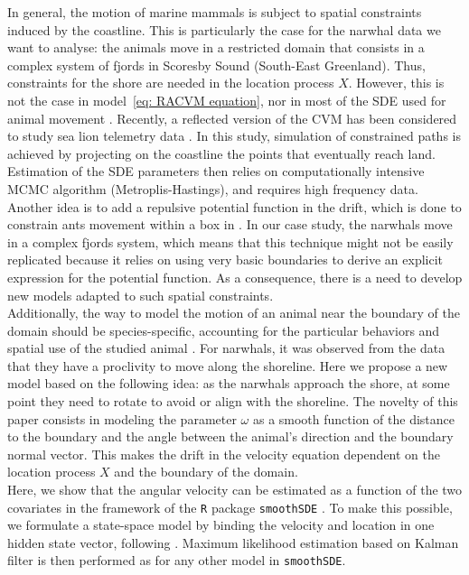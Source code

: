 \documentclass[11pt]{article}
\newcommand {\1}{\mathbb{1}}
\begin{document}
In general, the motion of marine mammals is subject to spatial constraints induced by the coastline. This is particularly the case for the narwhal data we want to analyse: the animals move in a restricted domain that consists in a complex system of fjords in Scoresby Sound (South-East Greenland). Thus, constraints for the shore are needed in the location process $X$. However, this is not the case in model~\ref{eq: RACVM equation}, nor in most of the SDE used for animal movement \cite{johnson_continuoustime_2008,michelot_varying-coefficient_2021,gurarie_correlated_2017}. 
Recently, a reflected version of the CVM has been considered to study sea lion telemetry data \cite{hanks_reflected_2017}.
In this study, simulation of constrained paths is achieved by projecting on the coastline the  points that eventually reach land. Estimation of the SDE parameters then relies on computationally intensive MCMC algorithm (Metroplis-Hastings), and requires high frequency data. Another idea is to add a repulsive potential function in the drift, which is done to constrain ants movement within a box in \cite{russell_spatially_2018}. In our case study, the narwhals move in a complex fjords system, which means that this technique might not be easily replicated because it relies on using very basic boundaries to derive an explicit expression for the potential function. As a consequence, there is a need to develop new models adapted to such spatial constraints.\\
Additionally, the way to model the motion of an animal near the boundary of the domain should be species-specific, accounting for the particular behaviors and spatial use of the studied animal \cite{brillinger_simulating_2003}. For narwhals, it was observed from the data that they have a proclivity to move along the shoreline. Here we propose a new model based on the following idea: as the narwhals approach the shore, at some point they need to rotate to avoid or align with the shoreline. The novelty of this paper consists in modeling the parameter $\omega$ as a smooth function of the distance to the boundary and the angle between the animal's direction and the boundary normal vector. This makes the drift in the velocity equation dependent on the location process $X$ and the boundary of the domain.  \\ %



Here, we show that the angular velocity  can be estimated as a function of the two covariates in the framework of the \texttt{R} package \texttt{smoothSDE} \cite{michelot_varying-coefficient_2021}. To make this possible, we formulate a state-space model by binding the velocity and location in one hidden state vector, following \cite{johnson_continuoustime_2008}. Maximum likelihood estimation based on Kalman filter is then performed as for any other model in \texttt{smoothSDE}.\\
\end{document}
